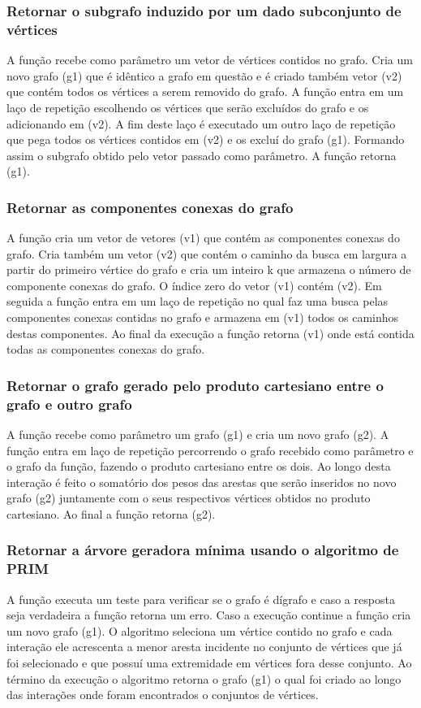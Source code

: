 \documentclass[a4paper, 12pt]{article}
\begin{document}
\subsubsection{Retornar o subgrafo induzido por um dado subconjunto de vértices}
A função recebe como parâmetro um vetor de vértices contidos no grafo. Cria um novo grafo (g1) que é idêntico a grafo em questão e é criado também vetor (v2) que contém todos os vértices a serem removido do grafo. A função entra em um laço de repetição escolhendo os vértices que serão excluídos do grafo e os adicionando em (v2). A fim deste laço é executado um outro laço de repetição que pega todos os vértices contidos em (v2) e os excluí do grafo (g1). Formando assim o subgrafo obtido pelo vetor passado como parâmetro. A função retorna (g1).

\subsubsection{Retornar as componentes conexas do grafo}
A função cria um vetor de vetores (v1) que contém as componentes conexas do grafo. Cria também um vetor (v2) que contém o caminho da busca em largura a partir do primeiro vértice do grafo e cria um inteiro k que armazena o número de componente conexas do grafo. O índice zero do vetor (v1) contém (v2). Em seguida a função entra em um laço de repetição no qual faz uma busca pelas componentes conexas contidas no grafo e armazena em (v1) todos os caminhos destas componentes. Ao final da execução a função retorna (v1) onde está contida todas as componentes conexas do grafo.

\subsubsection{Retornar o grafo gerado pelo produto cartesiano entre o grafo e outro grafo}
A função recebe como parâmetro um grafo (g1) e cria um novo grafo (g2). A função entra em laço de repetição percorrendo o grafo recebido como parâmetro e o grafo da função, fazendo o produto cartesiano entre os dois. Ao longo desta interação é feito o somatório dos pesos das arestas que serão inseridos no novo grafo (g2) juntamente com o seus respectivos vértices obtidos no produto cartesiano. Ao final a função retorna (g2).

\subsubsection{Retornar a árvore geradora mínima usando o algoritmo de PRIM}
A função executa um teste para verificar se o grafo é dígrafo e caso a resposta seja verdadeira a função retorna um erro. Caso a execução continue a função cria um novo grafo (g1). O algoritmo seleciona um vértice contido no grafo e cada interação ele acrescenta a menor aresta incidente no conjunto de vértices que já foi selecionado e que possuí uma extremidade em vértices fora desse conjunto. Ao término da execução o algoritmo retorna o grafo (g1) o qual foi criado ao longo das interações onde foram encontrados o conjuntos de vértices.
\end{document}
